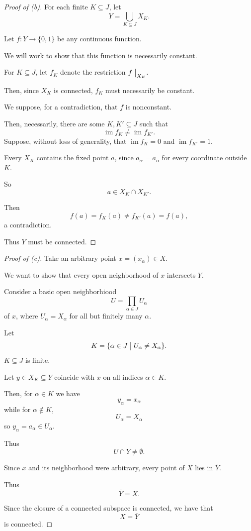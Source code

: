 \begin{proof}[Proof of (b)]
    For each finite $K \subseteq J$, let 
    \[
        Y = \bigcup_{K \subseteq J} X_K. 
    \]

    Let $f : Y \to \{0,1\}$ be any continuous function. 

    We will work to show that this function is 
    necessarily constant. 

    For $K \subseteq J$, let $f_K$ denote 
    the restriction $f \bigm|_{X_K}$. 
    
    Then, since $X_K$ is connected, $f_K$ 
    must necessarily be constant. 

    We suppose, for a contradiction, that $f$ is 
    nonconstant. 

    Then, necessarily, there are some $K,K' \subseteq J$ 
    such that 
    \[
        \operatorname{im} f_K \neq 
        \operatorname{im} f_{K'}. 
    \]
    Suppose, without loss of generality, that 
    $\operatorname{im} f_K = 0$ and 
    $\operatorname{im} f_{K'} = 1$. 

    Every $X_K$ contains the fixed point $a$, since 
    $a_\alpha = a_\alpha$ for every coordinate 
    outside $K$. 
    
    So 
    \[
        a \in X_K \cap X_{K'}. 
    \]

    Then 
    \[
        f(a) = f_K(a) \neq f_{K'}(a) = f(a), 
    \]
    a contradiction. 

    Thus $Y$ must be connected. 
\end{proof}

\begin{proof}[Proof of (c)]
    Take an arbitrary point 
    $x = (x_\alpha) \in X$. 

    We want to show that every open neighborhood of 
    $x$ intersects $Y$. 

    Consider a basic open neighborhiood 
    \[
        U = \prod_{\alpha \in J} U_\alpha 
    \]
    of $x$, where $U_\alpha = X_\alpha$ for all 
    but finitely many $\alpha$. 

    Let 
    \[
        K = \{\alpha \in J \bigm| U_\alpha \neq X_\alpha\}. 
    \]
    $K \subseteq J$ is finite. 

    Let $y \in X_K \subseteq Y$ coincide with $x$ on 
    all indices $\alpha \in K$. 
    
    Then, for $\alpha \in K$ we have 
    \[
        y_\alpha = x_\alpha 
    \]
    while for $\alpha \not\in K$, 
    \[
        U_\alpha = X_\alpha 
    \]
    so $y_\alpha = a_\alpha \in U_\alpha$. 

    Thus 
    \[
        U \cap Y \neq \emptyset. 
    \]

    Since $x$ and its neighborhood were arbitrary, 
    every point of $X$ lies in $\overline Y$. 

    Thus 
    \[
        \overline Y = X. 
    \]

    Since the closure of a connected subspace is connected, 
    we have that 
    \[
        X = \overline Y 
    \]
    is connected.
\end{proof}



